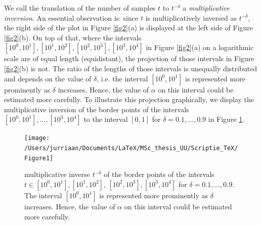 \documentclass[a4paper, twoside, 11pt]{report}
\theoremstyle{plain}
\theoremstyle{definition}
\theoremstyle{remark}
\begin{document}
We call the translation of the number of samples $t$ to $t^{-\delta}$ a \textit{multiplicative inversion}. An essential observation is: since $t$ is multiplicatively inversed as $t^{-\delta}$, the right side of the plot in Figure \ref{fig2}(a) is displayed at the left side of Figure \ref{fig2}(b). On top of that, where the intervals $[10^0,10^1], [10^1,10^2], [10^2,10^3], [10^3,10^4]$ in Figure \ref{fig2}(a) on a logarithmic scale are of equal length (equidistant), the projection of those intervals in Figure \ref{fig2}(b) is not. The ratio of the lengths of those intervals is unequally distributed and depends on the value of $\delta$, i.e. the interval $[10^0,10^1]$ is represented more prominently as $\delta$ increases. Hence, the value of $\alpha$ on this interval could be estimated more carefully.
To illustrate this projection graphically, we display the multiplicative inversion of the border points of the intervals $[10^0,10^1], \ldots, [10^3,10^4]$ to the interval $[0,1]$ for $\delta = 0.1, \ldots, 0.9$ in Figure \ref{fig4}.
\begin{figure}[t!]
\centering
\captionsetup{width = 0.9\textwidth}
\texttt{[image: /Users/jurriaan/Documents/LaTeX/MSc\_thesis\_UU/Scriptie\_TeX/Figure1]}
\caption{multiplicative inverse $t^{-\delta}$ of the border points of the intervals $t \in [10^0,10^1], [10^1,10^2]$,  $[10^2,10^3], [10^3,10^4]$ for $\delta = 0.1, \ldots, 0.9$. The interval $[10^0,10^1]$ is represented more prominently as $\delta$ increases. Hence, the value of $\alpha$ on this interval could be estimated more carefully.}
\label{fig4}
\end{figure}\newpage
\end{document}
